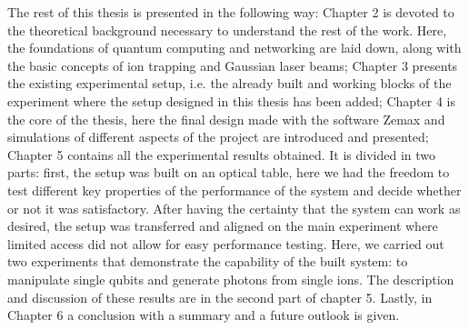 \documentclass[english, a4paper, 12pt, twoside]{book}
\numberwithin{equation}{section} %
\begin{document}
The rest of this thesis is presented in the following way: Chapter 2 is devoted to the theoretical background necessary to understand the rest of the work. Here, the foundations of quantum computing and networking are laid down, along with the basic concepts of ion trapping and Gaussian laser beams; Chapter 3 presents the existing experimental setup, i.e. the already built and working blocks of the experiment where the setup designed in this thesis has been added; Chapter 4 is the core of the thesis, here the final design made with the software Zemax and simulations of different aspects of the project are introduced and presented; Chapter 5 contains all the experimental results obtained. It is divided in two parts: first, the setup was built on an optical table, here we had the freedom to test different key properties of the performance of the system and decide whether or not it was satisfactory. After having the certainty that the system can work as desired, the setup was transferred and aligned on the main experiment where limited access did not allow for easy performance testing. Here, we carried out two experiments that demonstrate the capability of the built system: to manipulate single qubits and generate photons from single ions. The description and discussion of these results are in the second part of chapter 5. Lastly, in Chapter 6 a conclusion with a summary and a future outlook is given.













\newpage




\newpage
\renewcommand{\appendixpagename}{Appendix} %
\renewcommand{\appendixtocname}{Appendix} %
\addappheadtotoc
\end{document}
